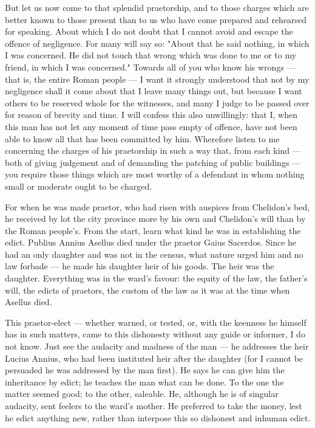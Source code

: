  But let us now come to that splendid praetorship, and to those charges which are better known to those present than to us who have come prepared and rehearsed for speaking. About which I do not doubt that I cannot avoid and escape the offence of negligence. For many will say so: "About that he said nothing, in which I was concerned. He did not touch that wrong which was done to me or to my friend, in which I was concerned." Towards all of you who know his wrongs --- that is, the entire Roman people --- I want it strongly understood that not by my negligence shall it come about that I leave many things out, but because I want others to be reserved whole for the witnesses, and many I judge to be passed over for reason of brevity and time. I will confess this also unwillingly: that I, when this man has not let any moment of time pass empty of offence, have not been able to know all that has been committed by him. Wherefore listen to me concerning the charges of his praetorship in such a way that, from each kind --- both of giving judgement and of demanding the patching of public buildings --- you require those things which are most worthy of a defendant in whom nothing small or moderate ought to be charged.

 For when he was made praetor, who had risen with auspices from Chelidon's bed, he received by lot the city province more by his own and Chelidon's will than by the Roman people's. From the start, learn what kind he was in establishing the edict. Publius Annius Asellus died under the praetor Gaius Sacerdos. Since he had an only daughter and was not in the census, what nature urged him and no law forbade --- he made his daughter heir of his goods. The heir was the daughter. Everything was in the ward's favour: the equity of the law, the father's will, the edicts of praetors, the custom of the law as it was at the time when Asellus died.

 This praetor-elect --- whether warned, or tested, or, with the keenness he himself has in such matters, came to this dishonesty without any guide or informer, I do not know. Just see the audacity and madness of the man --- he addresses the heir Lucius Annius, who had been instituted heir after the daughter (for I cannot be persuaded he was addressed by the man first). He says he can give him the inheritance by edict; he teaches the man what can be done. To the one the matter seemed good; to the other, saleable. He, although he is of singular audacity, sent feelers to the ward's mother. He preferred to take the money, lest he edict anything new, rather than interpose this so dishonest and inhuman edict.

